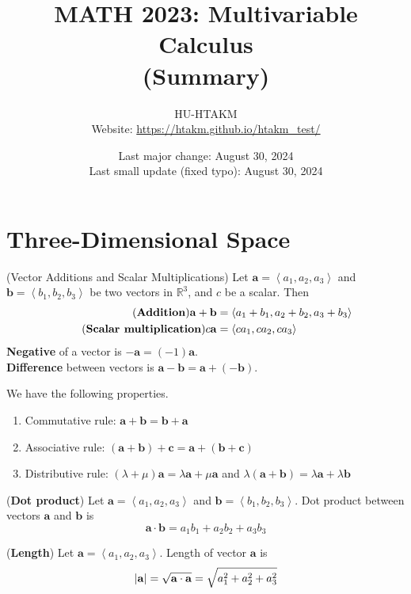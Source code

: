 \documentclass{huhtakm-template-book}
\title{MATH 2023: Multivariable Calculus \\ (Summary)}
\author{
	HU-HTAKM\\
	Website: \url{https://htakm.github.io/htakm_test/}
}
\date{
	Last major change: August 30, 2024\\
	Last small update (fixed typo): August 30, 2024
}
\begin{document}
\maketitle
\chapter{Three-Dimensional Space}
\begin{defn}(Vector Additions and Scalar Multiplications)
    Let $\mathbf{a}=\left<a_{1},a_{2},a_{3}\right>$ and $\mathbf{b}=\left<b_{1},b_{2},b_{3}\right>$ be two vectors in $\mathbb{R}^{3}$, and $c$ be a scalar. Then
    \begin{align*}
        \tag{\textbf{Addition}}
        \mathbf{a}+\mathbf{b}&=\left<a_{1}+b_{1},a_{2}+b_{2},a_{3}+b_{3}\right>\\
        \tag{\textbf{Scalar multiplication}}
        c\mathbf{a}&=\left<ca_{1},ca_{2},ca_{3}\right>
    \end{align*}
    \textbf{Negative} of a vector is $-\mathbf{a}=(-1)\mathbf{a}$.\\
    \textbf{Difference} between vectors is $\mathbf{a}-\mathbf{b}=\mathbf{a}+(-\mathbf{b})$.
\end{defn}
\begin{lem}
    We have the following properties.
    \begin{enumerate}
        \item Commutative rule: $\mathbf{a}+\mathbf{b}=\mathbf{b}+\mathbf{a}$
        \item Associative rule: $(\mathbf{a}+\mathbf{b})+\mathbf{c}=\mathbf{a}+(\mathbf{b}+\mathbf{c})$
        \item Distributive rule: $(\lambda+\mu)\mathbf{a}=\lambda\mathbf{a}+\mu\mathbf{a}$ and $\lambda(\mathbf{a}+\mathbf{b})=\lambda\mathbf{a}+\lambda\mathbf{b}$
    \end{enumerate}
\end{lem}
\begin{defn}(\textbf{Dot product})
    Let $\mathbf{a}=\left<a_{1},a_{2},a_{3}\right>$ and $\mathbf{b}=\left<b_{1},b_{2},b_{3}\right>$. Dot product between vectors $\mathbf{a}$ and $\mathbf{b}$ is
    \begin{equation*}
        \mathbf{a}\cdot\mathbf{b}=a_{1}b_{1}+a_{2}b_{2}+a_{3}b_{3}
    \end{equation*}
\end{defn}
\begin{defn}(\textbf{Length})
    Let $\mathbf{a}=\left<a_{1},a_{2},a_{3}\right>$. Length of vector $\mathbf{a}$ is
    \begin{equation*}
        \left|{\mathbf{a}}\right|=\sqrt{\mathbf{a}\cdot\mathbf{a}}=\sqrt{a_{1}^{2}+a_{2}^{2}+a_{3}^{2}}
    \end{equation*}
\end{defn}
\end{document}
